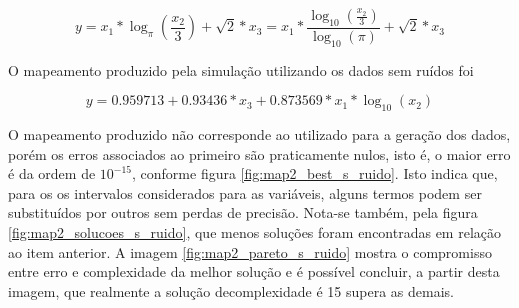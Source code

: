 \begin{equation}
y = x_1*\log_{\pi}\left( \frac{x_2}{3}  \right) + \sqrt{2}*x_3 = 
x_1*\frac{\log_{10}\left( \frac{x_2}{3}  \right)}{\log_{10}(\pi)} + \sqrt{2}*x_3
\label{eq:map2}
\end{equation}

O mapeamento produzido pela simulação utilizando os dados sem ruídos
foi 

\begin{equation}
y =  0.959713 + 0.93436*x_3 + 0.873569*x_1*\log_{10}(x_2)
\label{eq:map2_s}
\end{equation}

O mapeamento produzido não corresponde ao utilizado para a geração dos dados,
porém os erros associados ao primeiro são praticamente nulos, isto é, o maior
erro é da ordem de \(10^{-15}\), conforme figura \ref{fig:map2_best_s_ruido}.
Isto indica que, para os os intervalos considerados para as variáveis, alguns
termos podem ser substituídos por outros sem perdas de precisão. Nota-se também,
pela figura \ref{fig:map2_solucoes_s_ruido}, que menos soluções foram encontradas em relação ao
item anterior. A imagem \ref{fig:map2_pareto_s_ruido} mostra o compromisso entre
erro e complexidade da melhor solução e é possível concluir, a partir desta
imagem, que realmente a solução decomplexidade é 15 supera as demais.

\FloatBarrier
			    
